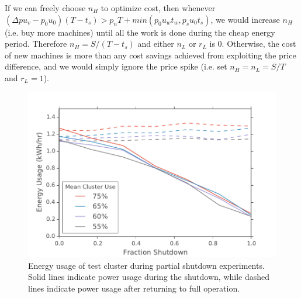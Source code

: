 \documentclass[letterpaper,twocolumn,10pt]{article}
\begin{document}
If we can freely choose $n_H$ to optimize cost, then whenever $(\Delta p u_v - p_0 u_0)(T-t_s) > p_n T + min(p_0 u_w t_w,p_s u_0 t_s)$, we would increase $n_H$ (i.e. buy more machines) until all the work is done during the cheap energy period. Therefore $n_H = S/(T-t_s)$ and either $n_L$ or $r_L$ is $0$.  Otherwise, the cost of new machines is more than any cost savings achieved from exploiting the price difference, and we would simply ignore the price spike (i.e. set $n_H = n_L = S/T$ and $r_L = 1$).

\begin{figure}[t]
	\begin{center}
		\includegraphics[scale=0.55]{down_v_pow}
	\end{center}
	\caption{Energy usage of test cluster during partial shutdown experiments.  Solid lines indicate power usage during the shutdown, while dashed lines indicate power usage after returning to full operation.}
	\label{down_v_pow}
\end{figure}
\end{document}
